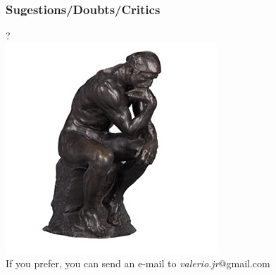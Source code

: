 \begin{frame}
 \end{frame}


\begin{frame}
  \frametitle{Sugestions/Doubts/Critics }
  	\begin{center}
    {\huge ?}\\
    \includegraphics[width=.5\textwidth]{figures/rodin.png}\\
    \large{ If you prefer, you can send an e-mail to 
    \textcolor{blue!70!black}{\textit{valerio.jr}}@gmail.com 
    }
	\end{center}
    
\end{frame}